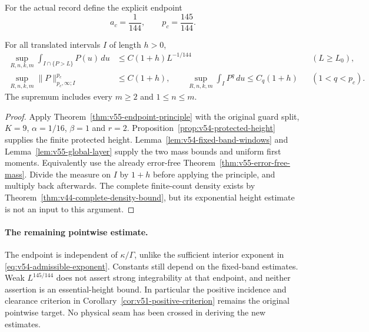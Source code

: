 For the actual record define the explicit endpoint
\begin{equation}\label{eq:v55-explicit-endpoint}
 a_c=\frac1{144},\qquad p_c=\frac{145}{144}.
\end{equation}
\begin{corollary}
\label{cor:v55-physical-endpoint}
For all translated intervals $I$ of length $h>0$,
\begin{align}
 \sup_{R,n,k,m}\int_{I\cap\{P>L\}}P(u)\,du
       &\le C(1+h)L^{-1/144} &&(L\ge L_0),
                                      \label{eq:v55-physical-tail}\\
 \sup_{R,n,k,m}\|P\|_{p_c,\infty;I}^{p_c}
       &\le C(1+h),\qquad
 \sup_{R,n,k,m}\int_I P^q\,du\le C_q(1+h)
                  &&(1<q<p_c).       \label{eq:v55-physical-weak}
\end{align}
The supremum includes every $m\ge2$ and $1\le n\le m$.
\end{corollary}
\begin{proof}
Apply Theorem~\ref{thm:v55-endpoint-principle} with the original guard
split, $K=9$, $\alpha=1/16$, $\beta=1$ and $r=2$.
Proposition~\ref{prop:v54-protected-height} supplies the finite
protected height. Lemma~\ref{lem:v54-fixed-band-windows} and
Lemma~\ref{lem:v55-global-layer} supply the two mass bounds and
uniform first moments. Equivalently use the already error-free
Theorem~\ref{thm:v55-error-free-mass}. Divide the measure on $I$ by
$1+h$ before applying the principle, and multiply back afterwards.
The complete finite-count density exists by
Theorem~\ref{thm:v44-complete-density-bound}, but its exponential
height estimate is not an input to this argument.
\end{proof}

\paragraph{The remaining pointwise estimate.}
The endpoint is independent of $\kappa/\Gamma$, unlike the sufficient
interior exponent in \eqref{eq:v54-admissible-exponent}. Constants
still depend on the fixed-band estimates. Weak $L^{145/144}$ does
not assert strong integrability at that endpoint, and neither assertion
is an essential-height bound. In particular the positive incidence
and clearance criterion in Corollary~\ref{cor:v51-positive-criterion}
remains the original pointwise target. No physical seam has been
crossed in deriving the new estimates.
